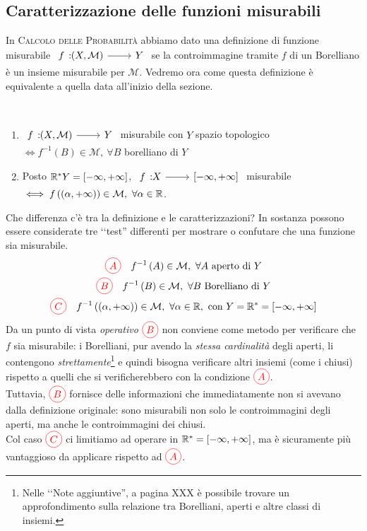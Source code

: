 \subsection{Caratterizzazione delle funzioni misurabili}
In \textsc{Calcolo delle Probabilità} abbiamo dato una definizione di funzione misurabile $\funz{f}{\left(X,\mathcal{M}\right)}{Y}$ se la controimmagine tramite $f$ di un Borelliano è un insieme misurabile per $\mathcal{M}$. Vedremo ora come questa definizione è equivalente a quella data all'inizio della sezione.
\begin{theorema}~{}\label{caratterizzazionefunzionimisurabili}
	\begin{enumerate}
		\item $\funz{f}{\left(X,\mathcal{M}\right)}{Y}$ misurabile con $Y$ spazio topologico $\iff f^{-1}\left(B\right)\in\mathcal{M},\ \forall B$ borelliano di $Y$
		\item Posto $\mathbb{R}^{\ast}Y=\left[-\infty,+\infty\right]$, $\funz{f}{X}{\left[-\infty,+\infty\right]}$ misurabile $\iff f\left(\left(\alpha,+\infty\right)\right)\in\mathcal{M},\ \forall \alpha\in\mathbb{R}$.
	\end{enumerate}
\end{theorema}
Che differenza c'è tra la definizione e le caratterizzazioni? In sostanza possono essere considerate tre ‘‘test'' differenti per mostrare o confutare che una funzione sia misurabile.
\begin{gather*}
	\textcolor{red}{\circled{A}}\quad f^{-1}\left(A\right)\in\mathcal{M},\ \forall A\text{ aperto di }Y\\
	\textcolor{red}{\circled{B}}\quad f^{-1}\left(B\right)\in\mathcal{M},\ \forall B\text{ Borelliano di }Y\\
	\textcolor{red}{\circled{C}}\quad f^{-1}\left(\left(\alpha,+\infty\right)\right)\in\mathcal{M},\ \forall \alpha\in\realset,\ \text{con }Y=\realset^{\ast}=\left[-\infty,+\infty\right]
\end{gather*}
Da un punto di vista \textit{operativo} $\textcolor{red}{\circled{B}}$ non conviene come metodo per verificare che $f$ sia misurabile: i Borelliani, pur avendo la \textit{stessa cardinalità} degli aperti, li contengono \textit{strettamente}\footnote{Nelle ‘‘Note aggiuntive'', a pagina XXX è possibile trovare un approfondimento sulla relazione tra Borelliani, aperti e altre classi di insiemi.} e quindi bisogna verificare altri insiemi (come i chiusi) rispetto a quelli che si verificherebbero con la condizione $\textcolor{red}{\circled{A}}$.\\
Tuttavia, $\textcolor{red}{\circled{B}}$ fornisce delle informazioni che immediatamente non si avevano dalla definizione originale: sono misurabili non solo le controimmagini degli aperti, ma anche le controimmagini dei chiusi.\\
Col caso $\textcolor{red}{\circled{C}}$ ci limitiamo ad operare in $\mathbb{R}^{\ast}=\left[-\infty,+\infty\right]$, ma è sicuramente più vantaggioso da applicare rispetto ad $\textcolor{red}{\circled{A}}$.
